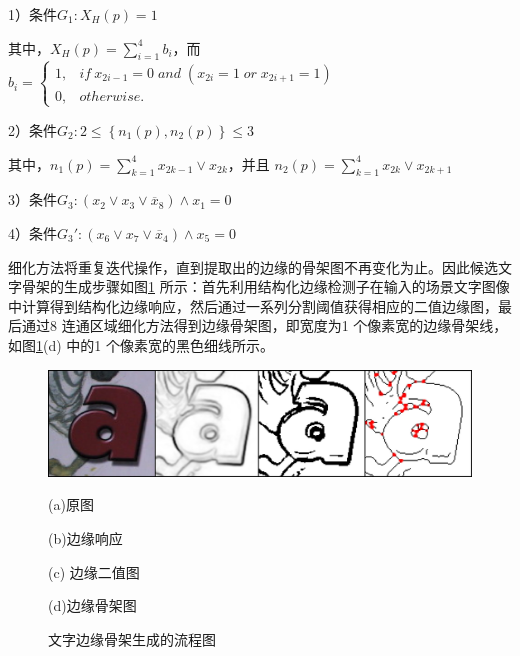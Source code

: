         1）条件$G_1: X_H(p)=1$

        其中，$X_H(p)=\sum\limits_{i=1}^4b_i$，而
        $b_i=\left\{
        \begin{array}{cl}
        1, &  if \ x_{2i-1}=0 \; and \; (x_{2i}=1 \; or \; x_{2i+1}=1)\\
        0, &  otherwise.
        \end{array}
        \right.$

        2）条件$G_2: 2\le \left\{n_1(p),n_2(p)\right\} \le3$

        其中，$n_1(p)=\sum\limits_{k=1}^4x_{2k-1}\lor x_{2k}$，并且
        $n_2(p)=\sum\limits_{k=1}^4x_{2k} \lor x_{2k+1}$

        3）条件$G_3: (x_2 \lor x_3 \lor \overline{x}_8) \land x_1=0$

        4）条件$G_3$$'$$: (x_6 \lor x_7 \lor \overline{x}_4) \land x_5=0$

        细化方法将重复迭代操作，直到提取出的边缘的骨架图不再变化为止。因此候选文字骨架的生成步骤如图\ref{fig.c3_skeleton} 所示：首先利用结构化边缘检测子在输入的场景文字图像中计算得到结构化边缘响应，然后通过一系列分割阈值获得相应的二值边缘图，最后通过8 连通区域细化方法得到边缘骨架图，即宽度为1 个像素宽的边缘骨架线，如图\ref{fig.c3_skeleton}(d) 中的1 个像素宽的黑色细线所示。

        \begin{figure}[htbp]
        \centering
        \includegraphics[width=\textwidth]{./figures/c3_skeleton.jpg}
        \begin{minipage}[t]{0.24\linewidth}
        \centerline{\small (a)原图}
        \end{minipage}
        \begin{minipage}[t]{0.24\linewidth}
        \centerline{\small (b)边缘响应}
        \end{minipage}
        \begin{minipage}[t]{0.24\linewidth}
        \centerline{\small(c) 边缘二值图}
        \end{minipage}
        \begin{minipage}[t]{0.24\linewidth}
        \centerline{\small (d)边缘骨架图}
        \end{minipage}
        \caption{文字边缘骨架生成的流程图}
        \label{fig.c3_skeleton}
        \end{figure}

